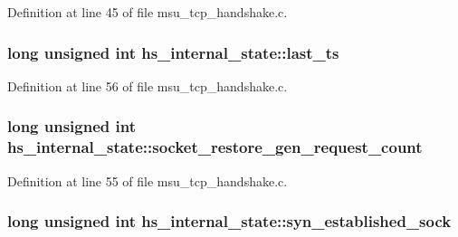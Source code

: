 Definition at line 45 of file msu\-\_\-tcp\-\_\-handshake.\-c.

\hypertarget{strucths__internal__state_ab18dbb54849487fe27896e6064e15a8a}{
\subsubsection[{last\-\_\-ts}]{\setlength{\rightskip}{0pt plus 5cm}long unsigned int hs\-\_\-internal\-\_\-state\-::last\-\_\-ts}}\label{strucths__internal__state_ab18dbb54849487fe27896e6064e15a8a}


Definition at line 56 of file msu\-\_\-tcp\-\_\-handshake.\-c.

\hypertarget{strucths__internal__state_ad339b73bc97babd709fb0e9074b25f33}{
\subsubsection[{socket\-\_\-restore\-\_\-gen\-\_\-request\-\_\-count}]{\setlength{\rightskip}{0pt plus 5cm}long unsigned int hs\-\_\-internal\-\_\-state\-::socket\-\_\-restore\-\_\-gen\-\_\-request\-\_\-count}}\label{strucths__internal__state_ad339b73bc97babd709fb0e9074b25f33}


Definition at line 55 of file msu\-\_\-tcp\-\_\-handshake.\-c.

\hypertarget{strucths__internal__state_a26b6501ff36adb3fe095afff480a8f95}{
\subsubsection[{syn\-\_\-established\-\_\-sock}]{\setlength{\rightskip}{0pt plus 5cm}long unsigned int hs\-\_\-internal\-\_\-state\-::syn\-\_\-established\-\_\-sock}}\label{strucths__internal__state_a26b6501ff36adb3fe095afff480a8f95}


